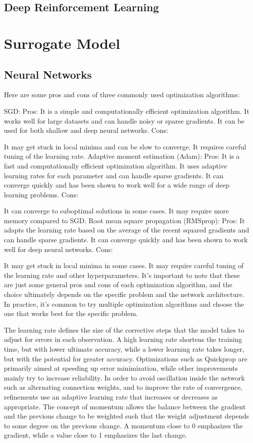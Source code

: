 \subsection{Deep Reinforcement Learning}

\section{Surrogate Model}

\subsection{Neural Networks}
Here are some pros and cons of three commonly used optimization algorithms:

\ac{SGD}:
Pros:
It is a simple and computationally efficient optimization algorithm.
It works well for large datasets and can handle noisy or sparse gradients.
It can be used for both shallow and deep neural networks.
Cons:

It may get stuck in local minima and can be slow to converge.
It requires careful tuning of the learning rate.
Adaptive moment estimation (Adam):
Pros:
It is a fast and computationally efficient optimization algorithm.
It uses adaptive learning rates for each parameter and can handle sparse gradients.
It can converge quickly and has been shown to work well for a wide range of deep learning problems.
Cons:

It can converge to suboptimal solutions in some cases.
It may require more memory compared to \ac{SGD}.
Root mean square propagation (RMSprop):
Pros:
It adapts the learning rate based on the average of the recent squared gradients and can handle sparse gradients.
It can converge quickly and has been shown to work well for deep neural networks.
Cons:

It may get stuck in local minima in some cases.
It may require careful tuning of the learning rate and other hyperparameters.
It's important to note that these are just some general pros and cons of each optimization algorithm, and the choice ultimately depends on the specific problem and the network architecture. In practice, it's common to try multiple optimization algorithms and choose the one that works best for the specific problem.

The learning rate defines the size of the corrective steps that the model takes to adjust for errors in each observation. A high learning rate shortens the training time, but with lower ultimate accuracy, while a lower learning rate takes longer, but with the potential for greater accuracy. Optimizations such as Quickprop are primarily aimed at speeding up error minimization, while other improvements mainly try to increase reliability. In order to avoid oscillation inside the network such as alternating connection weights, and to improve the rate of convergence, refinements use an adaptive learning rate that increases or decreases as appropriate. The concept of momentum allows the balance between the gradient and the previous change to be weighted such that the weight adjustment depends to some degree on the previous change. A momentum close to 0 emphasizes the gradient, while a value close to 1 emphasizes the last change.

